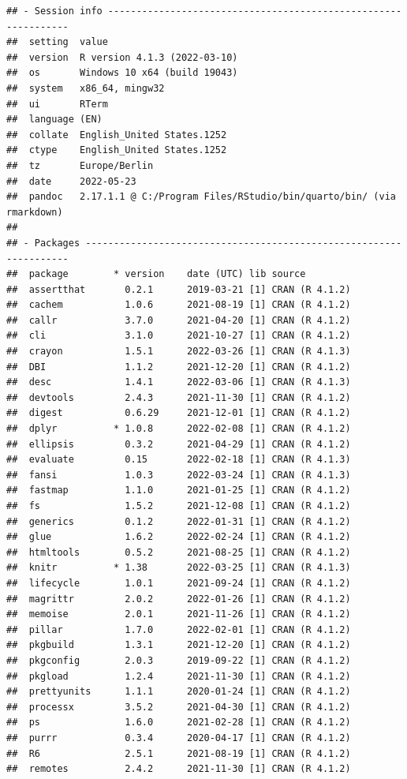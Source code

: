 \documentclass[10,a4paperpaper,]{article}
\begin{document}
\begin{verbatim}
## - Session info ---------------------------------------------------------------
##  setting  value
##  version  R version 4.1.3 (2022-03-10)
##  os       Windows 10 x64 (build 19043)
##  system   x86_64, mingw32
##  ui       RTerm
##  language (EN)
##  collate  English_United States.1252
##  ctype    English_United States.1252
##  tz       Europe/Berlin
##  date     2022-05-23
##  pandoc   2.17.1.1 @ C:/Program Files/RStudio/bin/quarto/bin/ (via rmarkdown)
## 
## - Packages -------------------------------------------------------------------
##  package        * version    date (UTC) lib source
##  assertthat       0.2.1      2019-03-21 [1] CRAN (R 4.1.2)
##  cachem           1.0.6      2021-08-19 [1] CRAN (R 4.1.2)
##  callr            3.7.0      2021-04-20 [1] CRAN (R 4.1.2)
##  cli              3.1.0      2021-10-27 [1] CRAN (R 4.1.2)
##  crayon           1.5.1      2022-03-26 [1] CRAN (R 4.1.3)
##  DBI              1.1.2      2021-12-20 [1] CRAN (R 4.1.2)
##  desc             1.4.1      2022-03-06 [1] CRAN (R 4.1.3)
##  devtools         2.4.3      2021-11-30 [1] CRAN (R 4.1.2)
##  digest           0.6.29     2021-12-01 [1] CRAN (R 4.1.2)
##  dplyr          * 1.0.8      2022-02-08 [1] CRAN (R 4.1.2)
##  ellipsis         0.3.2      2021-04-29 [1] CRAN (R 4.1.2)
##  evaluate         0.15       2022-02-18 [1] CRAN (R 4.1.3)
##  fansi            1.0.3      2022-03-24 [1] CRAN (R 4.1.3)
##  fastmap          1.1.0      2021-01-25 [1] CRAN (R 4.1.2)
##  fs               1.5.2      2021-12-08 [1] CRAN (R 4.1.2)
##  generics         0.1.2      2022-01-31 [1] CRAN (R 4.1.2)
##  glue             1.6.2      2022-02-24 [1] CRAN (R 4.1.2)
##  htmltools        0.5.2      2021-08-25 [1] CRAN (R 4.1.2)
##  knitr          * 1.38       2022-03-25 [1] CRAN (R 4.1.3)
##  lifecycle        1.0.1      2021-09-24 [1] CRAN (R 4.1.2)
##  magrittr         2.0.2      2022-01-26 [1] CRAN (R 4.1.2)
##  memoise          2.0.1      2021-11-26 [1] CRAN (R 4.1.2)
##  pillar           1.7.0      2022-02-01 [1] CRAN (R 4.1.2)
##  pkgbuild         1.3.1      2021-12-20 [1] CRAN (R 4.1.2)
##  pkgconfig        2.0.3      2019-09-22 [1] CRAN (R 4.1.2)
##  pkgload          1.2.4      2021-11-30 [1] CRAN (R 4.1.2)
##  prettyunits      1.1.1      2020-01-24 [1] CRAN (R 4.1.2)
##  processx         3.5.2      2021-04-30 [1] CRAN (R 4.1.2)
##  ps               1.6.0      2021-02-28 [1] CRAN (R 4.1.2)
##  purrr            0.3.4      2020-04-17 [1] CRAN (R 4.1.2)
##  R6               2.5.1      2021-08-19 [1] CRAN (R 4.1.2)
##  remotes          2.4.2      2021-11-30 [1] CRAN (R 4.1.2)

\end{verbatim}
\end{document}

